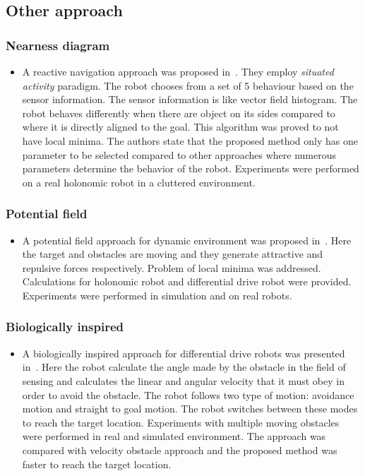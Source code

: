 \subsection{Other approach}%
\label{sub:other_approach}

\subsubsection{Nearness diagram}%
\label{ssub:nearness_diagram}
\begin{itemize}
    \item A reactive navigation approach was proposed in~\cite{minguez2004nearness}. They employ \textit{situated activity} paradigm. The robot chooses from a set of 5 behaviour based on the sensor information. The sensor information is like vector field histogram. The robot behaves differently when there are object on its sides compared to where it is directly aligned to the goal. This algorithm was proved to not have local minima. The authors state that the proposed method only has one parameter to be selected compared to other approaches where numerous parameters determine the behavior of the robot. Experiments were performed on a real holonomic robot in a cluttered environment.
\end{itemize}


\subsubsection{Potential field}%
\label{subsub:potential_field}
\begin{itemize}
    \item A potential field approach for dynamic environment was proposed in~\cite{ge2002dynamic}. Here the target and obstacles are moving and they generate attractive and repulsive forces respectively. Problem of local minima was addressed. Calculations for holonomic robot and differential drive robot were provided. Experiments were performed in simulation and on real robots. 
\end{itemize}

\subsubsection{Biologically inspired}%
\label{subsub:biologically_inspired}
\begin{itemize}
    \item A biologically inspired approach for differential drive robots was presented in~\cite{savkin2013simple}. Here the robot calculate the angle made by the obstacle in the field of sensing and calculates the linear and angular velocity that it must obey in order to avoid the obstacle. The robot follows two type of motion: avoidance motion and straight to goal motion. The robot switches between these modes to reach the target location. Experiments with multiple moving obstacles were performed in real and simulated environment. The approach was compared with velocity obstacle approach and the proposed method was faster to reach the target location.
\end{itemize}

